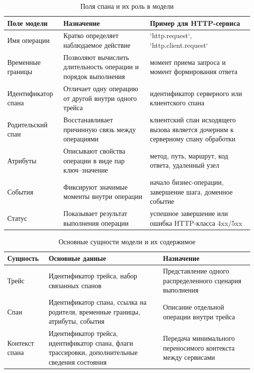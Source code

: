 \begin{table}[H]
    \centering
    \caption{Поля спана и их роль в модели}
    \label{tab:span-fields}
    \renewcommand{\arraystretch}{1.2}
    \begin{tabularx}{\textwidth}{>{\raggedright\arraybackslash}p{3.2cm} >{\raggedright\arraybackslash}X >{\raggedright\arraybackslash}X}
        \toprule
        Поле модели & Назначение & Пример для HTTP-сервиса \\
        \midrule
        Имя операции & Кратко определяет наблюдаемое действие & `http.request`, `http.client.request` \\
        \addlinespace
        Временные границы & Позволяют вычислить длительность операции и порядок выполнения & момент приема запроса и момент формирования ответа \\
        \addlinespace
        Идентификатор спана & Отличает одну операцию от другой внутри одного трейса & идентификатор серверного или клиентского спана \\
        \addlinespace
        Родительский спан & Восстанавливает причинную связь между операциями & клиентский спан исходящего вызова является дочерним к серверному спану обработки \\
        \addlinespace
        Атрибуты & Описывают свойства операции в виде пар ключ--значение & метод, путь, маршрут, код ответа, удаленный узел \\
        \addlinespace
        События & Фиксируют значимые моменты внутри операции & начало бизнес-операции, завершение шага, доменное событие \\
        \addlinespace
        Статус & Показывает результат выполнения операции & успешное завершение или ошибка HTTP-класса 4xx/5xx \\
        \bottomrule
    \end{tabularx}
\end{table}

\begin{table}[H]
    \centering
    \caption{Основные сущности модели и их содержимое}
    \label{tab:model-entities}
    \renewcommand{\arraystretch}{1.2}
    \begin{tabularx}{\textwidth}{>{\raggedright\arraybackslash}p{2.7cm} >{\raggedright\arraybackslash}X >{\raggedright\arraybackslash}X}
        \toprule
        Сущность & Основные данные & Назначение \\
        \midrule
        Трейс & Идентификатор трейса, набор связанных спанов & Представление одного распределенного сценария выполнения \\
        \addlinespace
        Спан & Идентификатор спана, ссылка на родителя, временные границы, атрибуты, события & Описание отдельной операции внутри трейса \\
        \addlinespace
        Контекст спана & Идентификатор трейса, идентификатор спана, флаги трассировки, дополнительные сведения состояния & Передача минимального переносимого контекста между сервисами \\
        \bottomrule
    \end{tabularx}
\end{table}

